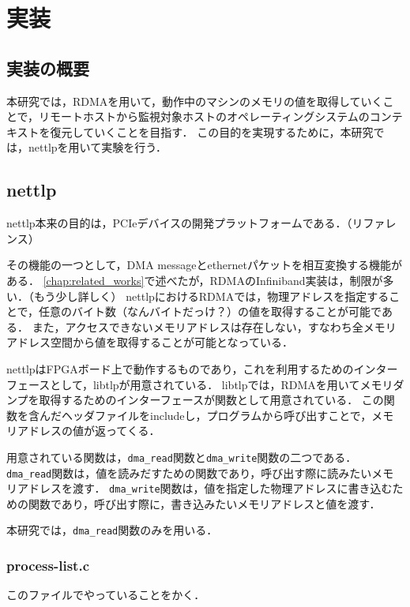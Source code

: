 \chapter{実装}
\label{chap:implementation}

\section{実装の概要}

本研究では，RDMAを用いて，動作中のマシンのメモリの値を取得していくことで，リモートホストから監視対象ホストのオペレーティングシステムのコンテキストを復元していくことを目指す．
この目的を実現するために，本研究では，nettlpを用いて実験を行う．

\section{nettlp}
\label{section:nettlp}

nettlp本来の目的は，PCIeデバイスの開発プラットフォームである．（リファレンス）

その機能の一つとして，DMA messageとethernetパケットを相互変換する機能がある．
\ref{chap:related_works}で述べたが，RDMAのInfiniband実装は，制限が多い．（もう少し詳しく）
nettlpにおけるRDMAでは，物理アドレスを指定することで，任意のバイト数（なんバイトだっけ？）の値を取得することが可能である．
また，アクセスできないメモリアドレスは存在しない，すなわち全メモリアドレス空間から値を取得することが可能となっている．

nettlpはFPGAボード上で動作するものであり，これを利用するためのインターフェースとして，libtlpが用意されている．
libtlpでは，RDMAを用いてメモリダンプを取得するためのインターフェースが関数として用意されている．
この関数を含んだヘッダファイルをincludeし，プログラムから呼び出すことで，メモリアドレスの値が返ってくる．

用意されている関数は，\verb|dma_read|関数と\verb|dma_write|関数の二つである．
\verb|dma_read|関数は，値を読みだすための関数であり，呼び出す際に読みたいメモリアドレスを渡す．
\verb|dma_write|関数は，値を指定した物理アドレスに書き込むための関数であり，呼び出す際に，書き込みたいメモリアドレスと値を渡す．

本研究では，\verb|dma_read|関数のみを用いる．

\subsection{process-list.c}

このファイルでやっていることをかく．

